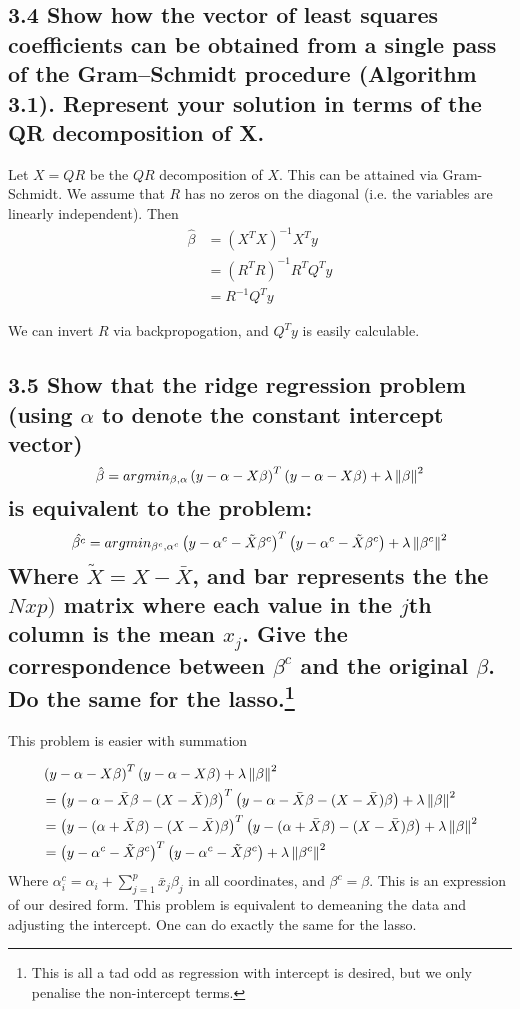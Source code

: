 \subsection*{ 3.4 Show how the vector of least squares coefficients can be obtained
from a single pass of the Gram–Schmidt procedure (Algorithm 3.1). Represent your solution in terms of the QR decomposition of X.}

Let $X = QR$ be the $QR$ decomposition of $X$. This can be attained via Gram-Schmidt. We assume that $R$ has no zeros on the diagonal (i.e. the variables are linearly independent).
Then 
\begin{align*}
    \hat{\beta} &= (X^T X)^{-1} X^T y \\
    &= (R^T R)^{-1} R^T Q^T y \\
    &= R^{-1} Q^T y
\end{align*}

We can invert $R$ via backpropogation, and $Q^T y$ is easily calculable.

\subsection*{3.5 Show that the ridge regression problem (using $\alpha$ to denote the constant intercept vector)
$$\hat{\beta} = argmin_{\beta,\alpha} \left(y - \alpha - X \beta\right)^T\left(y - \alpha - X \beta\right) + \lambda \left\lVert\beta\right\rVert^2 $$
is equivalent to the problem:
$$\hat{\beta^c} = argmin_{\beta^c, \alpha^c} \left(y - \alpha^c - \tilde{X} \beta^c\right)^T\left(y - \alpha^c - \tilde{X} \beta^c\right) + \lambda \left\lVert\beta^c\right\rVert^2 $$
Where $\tilde{X} = X - \bar{X}$, and bar represents the the $N x p)$ matrix where each value in the $j$th column is the mean $x_j$. Give the correspondence between $\beta^c$ and the original $\beta$. Do the same for the lasso.\footnote{
This is all a tad odd as regression with intercept is desired, but we only penalise the non-intercept terms.}}

This problem is easier with summation

\begin{align*}
   &\left(y - \alpha - X \beta\right)^T\left(y - \alpha - X \beta\right) + \lambda \left\lVert\beta\right\rVert^2\\ &=
   \left(y - \alpha - \bar{X} \beta - (X - \bar{X}) \beta\right)^T\left(y - \alpha - \bar{X} \beta - (X - \bar{X}) \beta\right) + \lambda \left\lVert\beta\right\rVert^2\\ &=
   \left(y - (\alpha + \bar{X} \beta) - (X - \bar{X}) \beta\right)^T\left(y - (\alpha + \bar{X} \beta) - (X - \bar{X}) \beta\right) + \lambda \left\lVert\beta\right\rVert^2\\ &=
   \left(y - \alpha^c - \tilde{X} \beta^c\right)^T\left(y - \alpha^c - \tilde{X} \beta^c\right) + \lambda \left\lVert\beta^c\right\rVert^2
\end{align*}
Where $\alpha^c_i = \alpha_i + \sum_{j = 1}^p \bar{x}_j \beta_j$ in all coordinates, and $\beta^c = \beta$. This is an expression of our desired form.
This problem is equivalent to demeaning the data and adjusting the intercept.
One can do exactly the same for the lasso.


